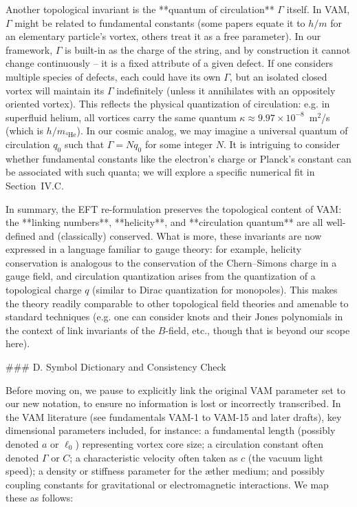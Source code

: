 \documentclass[12pt]{article}
\begin{document}
Another topological invariant is the **quantum of circulation** $\Gamma$ itself. In VAM, $\Gamma$ might be related to fundamental constants (some papers equate it to $h/m$ for an elementary particle’s vortex, others treat it as a free parameter). In our framework, $\Gamma$ is built-in as the charge of the string, and by construction it cannot change continuously – it is a fixed attribute of a given defect. If one considers multiple species of defects, each could have its own $\Gamma$, but an isolated closed vortex will maintain its $\Gamma$ indefinitely (unless it annihilates with an oppositely oriented vortex). This reflects the physical quantization of circulation: e.g. in superfluid helium, all vortices carry the same quantum $\kappa \approx 9.97\times10^{-8}$ m$^2$/s (which is $h/m_{^4\mathrm{He}}$). In our cosmic analog, we may imagine a universal quantum of circulation $q_0$ such that $\Gamma = N q_0$ for some integer $N$. It is intriguing to consider whether fundamental constants like the electron’s charge or Planck’s constant can be associated with such quanta; we will explore a specific numerical fit in Section IV.C.

In summary, the EFT re-formulation preserves the topological content of VAM: the **linking numbers**, **helicity**, and **circulation quantum** are all well-defined and (classically) conserved. What is more, these invariants are now expressed in a language familiar to gauge theory: for example, helicity conservation is analogous to the conservation of the Chern–Simons charge in a gauge field, and circulation quantization arises from the quantization of a topological charge $q$ (similar to Dirac quantization for monopoles). This makes the theory readily comparable to other topological field theories and amenable to standard techniques (e.g. one can consider knots and their Jones polynomials in the context of link invariants of the $B$-field, etc., though that is beyond our scope here).

### D. Symbol Dictionary and Consistency Check

Before moving on, we pause to explicitly link the original VAM parameter set to our new notation, to ensure no information is lost or incorrectly transcribed. In the VAM literature (see fundamentals VAM-1 to VAM-15 and later drafts), key dimensional parameters included, for instance: a fundamental length (possibly denoted $a$ or $\ell_0$) representing vortex core size; a circulation constant often denoted $\Gamma$ or $C$; a characteristic velocity often taken as $c$ (the vacuum light speed); a density or stiffness parameter for the æther medium; and possibly coupling constants for gravitational or electromagnetic interactions. We map these as follows: 
\end{document}
